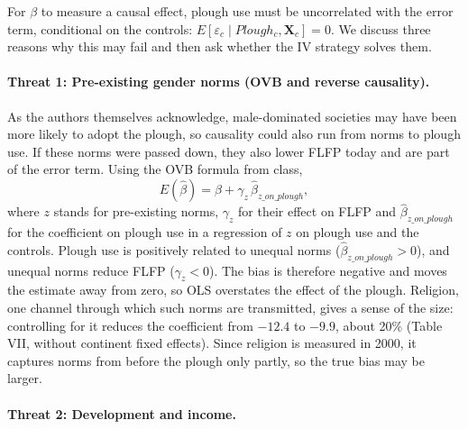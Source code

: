 \documentclass[12pt,a4paper]{article}
\begin{document}
For $\beta$ to measure a causal effect, plough use must be uncorrelated with the error term, conditional on the controls: $E[\varepsilon_c \mid Plough_c, \mathbf{X}_c] = 0$. We discuss three reasons why this may fail and then ask whether the IV strategy solves them.

\paragraph{Threat 1: Pre-existing gender norms (OVB and reverse causality).}

As the authors themselves acknowledge, male-dominated societies may have been more likely to adopt the plough, so causality could also run from norms to plough use. If these norms were passed down, they also lower FLFP today and are part of the error term. Using the OVB formula from class,
\[
E(\hat\beta) = \beta + \gamma_z \, \hat\beta_{z\_on\_plough} ,
\]
where $z$ stands for pre-existing norms, $\gamma_z$ for their effect on FLFP and $\hat\beta_{z\_on\_plough}$ for the coefficient on plough use in a regression of $z$ on plough use and the controls. Plough use is positively related to unequal norms ($\hat\beta_{z\_on\_plough} > 0$), and unequal norms reduce FLFP ($\gamma_z < 0$). The bias is therefore negative and moves the estimate away from zero, so OLS overstates the effect of the plough. Religion, one channel through which such norms are transmitted, gives a sense of the size: controlling for it reduces the coefficient from $-12.4$ to $-9.9$, about 20\% (Table VII, without continent fixed effects). Since religion is measured in 2000, it captures norms from before the plough only partly, so the true bias may be larger.

\paragraph{Threat 2: Development and income.}
\end{document}
